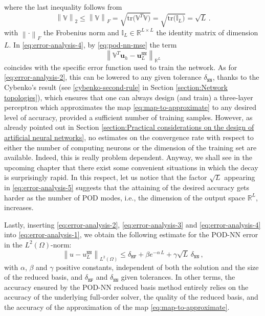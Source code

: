 \documentclass[12pt, a4paper, twoside, openright, notitlepage]{report}
\numberwithin{equation}{chapter}
\theoremstyle{theorem}
\theoremstyle{definition}
\theoremstyle{remark}
\theoremstyle{proposition}
\numberwithin{figure}{chapter}
\newcommand{\norm}[1]{\left\lVert#1\right\rVert}
\begin{document}
		where the last inequality follows from
		\begin{equation*}
			\norm{\mathbb{V}}_2 \leq \norm{\mathbb{V}}_F = \sqrt{\text{tr} \big( \mathbb{V}^T \mathbb{V} \big)} = \sqrt{\text{tr} \big( \mathbb{I}_L \big)} = \sqrt{L} \, .
		\end{equation*}
		with $\norm{\cdot}_F$ the Frobenius norm and $\mathbb{I}_L \in \mathbb{R}^{L \times L}$ the identity matrix of dimension $L$. In \eqref{eq:error-analysis-4}, by \eqref{eq:pod-nn-mse} the term
		\begin{equation}
			\label{eq:error-analysis-5}
			\norm{\mathbb{V}^T \mathbf{u}_h - \mathbf{u}_L^{\texttt{NN}}}_{\mathbb{R}^L}
		\end{equation}
		coincides with the specific error function used to train the network. As for \eqref{eq:error-analysis-2}, this can be lowered to any given tolerance $\delta_{\texttt{NN}}$, thanks to the Cybenko's result (see \ref{cybenko-second-rule} in Section \ref{section:Network topologies}), which ensures that one can always design (and train) a three-layer perceptron which approximates the map \eqref{eq:map-to-approximate} to any desired level of accuracy, provided a sufficient number of training samples. However, as already pointed out in Section \ref{section:Practical considerations on the design of artificial neural networks}, no estimates on the convergence rate with respect to either the number of computing neurons or the dimension of the training set are available. Indeed, this is really problem dependent. Anyway, we shall see in the upcoming chapter that there exist some convenient situations in which the decay is surprisingly rapid. In this respect, let us notice that the factor $\sqrt{L}$ appearing in \eqref{eq:error-analysis-5} suggests that the attaining of the desired accuracy gets harder as the number of POD modes, i.e., the dimension of the output space $\mathbb{R}^L$, increases.
		
		Lastly, inserting \eqref{eq:error-analysis-2}, \eqref{eq:error-analysis-3} and \eqref{eq:error-analysis-4} into \eqref{eq:error-analysis-1}, we obtain the following estimate for the POD-NN error in the $L^2(\Omega)$-norm:
		\begin{equation*}
			\label{eq:error-analysis-final}
			\norm{u - u_L^{\texttt{NN}}}_{L^2(\Omega)} \leq \delta_{\texttt{HF}} + \beta e^{-\alpha \, L} + \gamma \sqrt{L} \, \delta_{\texttt{NN}} \, ,
		\end{equation*}
		with $\alpha$, $\beta$ and $\gamma$ positive constants, independent of both the solution and the size of the reduced basis, and $\delta_{\texttt{HF}}$ and $\delta_{\texttt{NN}}$ given tolerances. In other terms, the accuracy ensured by the POD-NN reduced basis method entirely relies on the accuracy of the underlying full-order solver, the quality of the reduced basis, and the accuracy of the approximation of the map \eqref{eq:map-to-approximate}.
				
\end{document}
